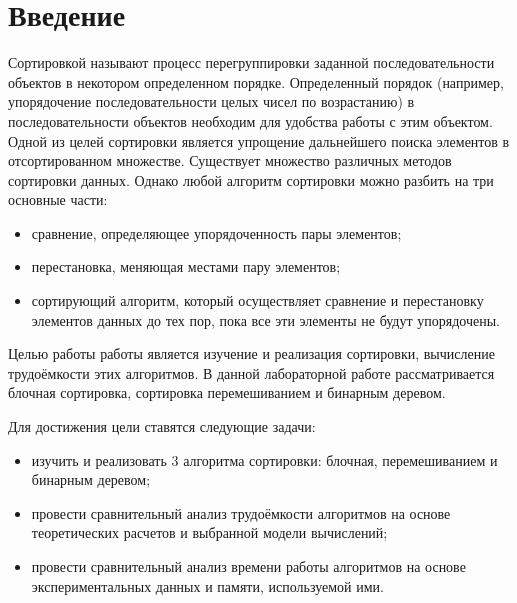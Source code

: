 \chapter*{Введение}


Сортировкой называют процесс перегруппировки заданной последовательности объектов в некотором определенном порядке. Определенный порядок (например, упорядочение последовательности целых чисел по возрастанию) в последовательности объектов необходим для удобства работы с этим объектом. Одной из целей сортировки является упрощение дальнейшего поиска элементов в отсортированном множестве. Существует множество различных методов сортировки данных. Однако любой алгоритм сортировки можно разбить на три основные части:

\begin{itemize}
	\item сравнение, определяющее упорядоченность пары элементов;
	\item перестановка, меняющая местами пару элементов;
	\item сортирующий алгоритм, который осуществляет сравнение и перестановку элементов данных до тех пор, пока все эти элементы не будут упорядочены.
\end{itemize}

Целью работы работы является изучение и реализация сортировки, вычисление трудоёмкости этих алгоритмов. В данной
лабораторной работе рассматривается блочная сортировка, сортировка перемешиванием и бинарным деревом.

Для достижения цели ставятся следующие задачи:
\begin{itemize}
	\item изучить и реализовать 3 алгоритма сортировки: блочная, перемешиванием и бинарным деревом;
	\item провести сравнительный анализ трудоёмкости алгоритмов на основе теоретических расчетов и выбранной модели вычислений;
	\item провести сравнительный анализ времени работы алгоритмов на основе экспериментальных данных и памяти, используемой ими. 
\end{itemize}
